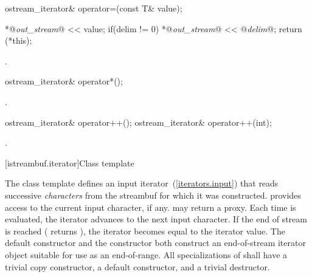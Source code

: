 %
%
\begin{itemdecl}
ostream_iterator& operator=(const T& value);
\end{itemdecl}

\begin{itemdescr}
\pnum
\effects
\begin{codeblock}
*@\textit{out_stream}@ << value;
if(delim != 0)
  *@\textit{out_stream}@ << @\textit{delim}@;
return (*this);
\end{codeblock}

\begin{addedblock}
\pnum
\requires {}.
\end{addedblock}
\end{itemdescr}

%
%
\begin{itemdecl}
ostream_iterator& operator*();
\end{itemdecl}

\begin{itemdescr}
\pnum
\returns
{}.
\end{itemdescr}

%
%
\begin{itemdecl}
ostream_iterator& operator++();
ostream_iterator& operator++(int);
\end{itemdecl}

\begin{itemdescr}
\pnum
\returns
{}.
\end{itemdescr}

[istreambuf.iterator]{Class template }

\pnum
The
class template
defines an input iterator~(\ref{iterators.input}) that
reads successive
\textit{characters}
from the streambuf for which it was constructed.
provides access to the current input character, if any.
\enternote {} may return a proxy. \exitnote
Each time
is evaluated, the iterator advances to the next input character.
If the end of stream is reached ( returns
),
the iterator becomes equal to the
iterator value.
The default constructor
and the constructor
both construct an end-of-stream iterator object suitable for use
as an end-of-range.
All specializations of  shall have a trivial copy
constructor, a  default constructor, and a trivial destructor.

